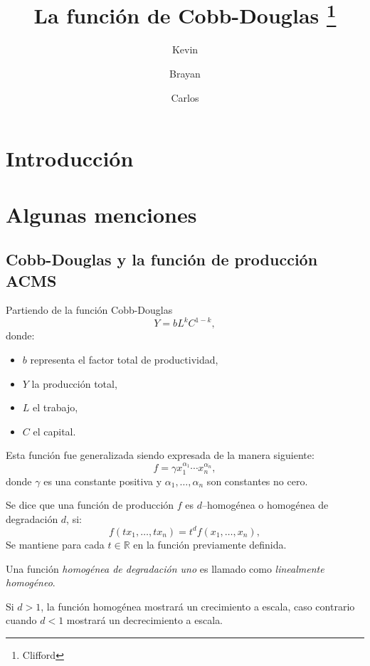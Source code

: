 \documentclass[
    a4paper,%
    11pt, %
    fleqn %
]{article}
\title{
    La función de Cobb-Douglas
    \thanks{Clifford}
}
\author{
    Kevin\and
    Brayan\and
    Carlos
}
\begin{document}
\maketitle

\section{Introducción}
\lipsum[1]

\section{Algunas menciones}

\subsection{Cobb-Douglas y la función de producción ACMS}

Partiendo de la función Cobb-Douglas
\begin{equation}%
Y = bL^{k}C^{1-k},
\end{equation}
donde:
\begin{itemize}
	\item $b$ representa el factor total de productividad,
	\item $Y$ la producción total,
	\item $L$ el trabajo,
	\item $C$ el capital.
\end{itemize}
Esta función fue generalizada siendo expresada de la manera siguiente:
\begin{equation}%
f = \gamma{x}_{1}^{\alpha_{1}}\cdots x_{n}^{\alpha_{n}},
\end{equation}
donde $\gamma$ es una constante positiva y $\alpha_{1},\ldots,\alpha_{n}$ son constantes no cero.

Se dice que una función de producción $f$ es $d$--homogénea o homogénea de degradación $d$, si:
\begin{equation}%
f\left(tx_{1},\ldots,tx_{n}\right) = t^{d}f\left(x_{1},\ldots,x_{n}\right),
\end{equation}
Se mantiene para cada $t\in\mathbb{R}$ en la función previamente definida.

Una función \emph{homogénea de degradación uno} es llamado como \emph{linealmente homogéneo}.

Si $d>1$, la función homogénea mostrará un crecimiento a escala, caso contrario cuando $d<1$ mostrará un decrecimiento a escala.
\end{document}
